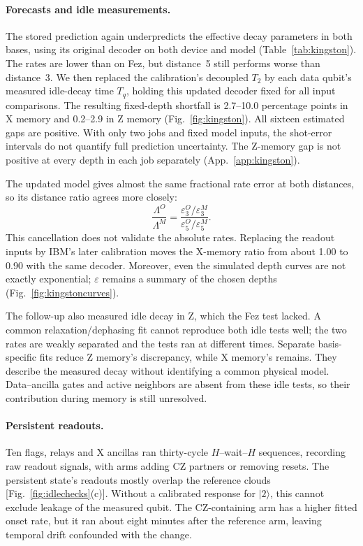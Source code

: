 \documentclass[aps,pra,reprint,nofootinbib,longbibliography,floatfix,showkeys]{revtex4-2}
\newcommand{\ket}[1]{\lvert #1\rangle}
\newcommand{\eps}{\varepsilon}
\begin{document}
\paragraph*{Forecasts and idle measurements.}
The stored prediction again underpredicts the effective decay parameters in both bases, using its original decoder on both device and model (Table~\ref{tab:kingston}).
The rates are lower than on Fez, but distance~5 still performs worse than distance~3.
We then replaced the calibration's decoupled $T_2$ by each data qubit's measured idle-decay time $T_q$, holding this updated decoder fixed for all input comparisons.
The resulting fixed-depth shortfall is 2.7--10.0 percentage points in X memory and 0.2--2.9 in Z memory (Fig.~\ref{fig:kingston}).
All sixteen estimated gaps are positive.
With only two jobs and fixed model inputs, the shot-error intervals do not quantify full prediction uncertainty.
The Z-memory gap is not positive at every depth in each job separately (App.~\ref{app:kingston}).

The updated model gives almost the same fractional rate error at both distances, so its distance ratio agrees more closely:
\begin{equation}
\frac{\Lambda^O}{\Lambda^M}
=\frac{\eps_3^O/\eps_3^M}{\eps_5^O/\eps_5^M}.
\end{equation}
This cancellation does not validate the absolute rates.
Replacing the readout inputs by IBM's later calibration moves the X-memory ratio from about 1.00 to 0.90 with the same decoder.
Moreover, even the simulated depth curves are not exactly exponential; $\eps$ remains a summary of the chosen depths (Fig.~\ref{fig:kingstoncurves}).

The follow-up also measured idle decay in Z, which the Fez test lacked.
A common relaxation/dephasing fit cannot reproduce both idle tests well; the two rates are weakly separated and the tests ran at different times.
Separate basis-specific fits reduce Z memory's discrepancy, while X memory's remains.
They describe the measured decay without identifying a common physical model.
Data--ancilla gates and active neighbors are absent from these idle tests, so their contribution during memory is still unresolved.

\paragraph*{Persistent readouts.}
Ten flags, relays and X ancillas ran thirty-cycle $H$--wait--$H$ sequences, recording raw readout signals, with arms adding CZ partners or removing resets.
The persistent state's readouts mostly overlap the reference clouds [Fig.~\ref{fig:idlechecks}(c)].
Without a calibrated response for $\ket{2}$, this cannot exclude leakage of the measured qubit.
The CZ-containing arm has a higher fitted onset rate, but it ran about eight minutes after the reference arm, leaving temporal drift confounded with the change.
\end{document}
